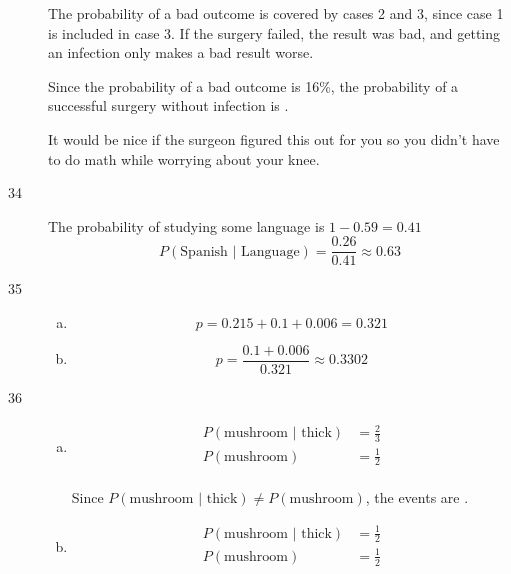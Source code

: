 \documentclass[letterpaper, landscape]{exam}
\begin{document}
\begin{description}
      The probability of a bad outcome is covered by cases 2 and 3, since case 1
      is included in case 3. If the surgery failed, the result was bad, and
      getting an infection only makes a bad result worse.
      
      Since the probability of a bad outcome is 16\%, the probability of a
      successful surgery without infection is .

      It would be nice if the surgeon figured this out for you so you didn't
      have to do math while worrying about your knee.


    \item[34]
      The probability of studying some language is $1 - 0.59 = 0.41$
      \[
        P(\text{Spanish } | \text{ Language}) = \frac{0.26}{0.41} 
          \approx \boxed{ 0.63 }
      \]

    \item[35]
      \begin{enumerate}[(a)]
        \item 
          \[
            p = 0.215 + 0.1 + 0.006 = \boxed{ 0.321 }
          \]

        \item
          \[
            p = \frac{0.1 + 0.006}{0.321} \approx \boxed{ 0.3302 }
          \]
      \end{enumerate}

    \item[36]
      \begin{enumerate}[(a)]
        \item 
          \begin{align*}
            P(\text{mushroom } | \text{ thick}) & = \frac{2}{3} \\
            P(\text{mushroom})                  & = \frac{1}{2} \\
          \end{align*}

          Since $P(\text{mushroom } | \text{ thick}) \ne P(\text{mushroom})$,
          the events are .
          
        \item 
          \begin{align*}
            P(\text{mushroom } | \text{ thick}) & = \frac{1}{2} \\
            P(\text{mushroom})                  & = \frac{1}{2} \\
          \end{align*}
          

\end{enumerate}
\end{description}
\end{document}
